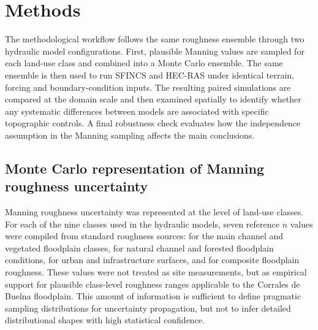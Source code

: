 \documentclass[a4paper,fleqn]{cas-sc}
\newcommand{\nman}{$n$}
\newcommand{\sfincs}{\textsc{SFINCS}}
\newcommand{\hecras}{\textsc{HEC-RAS}}
\begin{document}
\section{Methods}
\label{sec:methods}
The methodological workflow follows the same roughness ensemble through two hydraulic model configurations. First, plausible Manning values are sampled for each land-use class and combined into a Monte Carlo ensemble. The same ensemble is then used to run \sfincs{} and \hecras{} under identical terrain, forcing and boundary-condition inputs. The resulting paired simulations are compared at the domain scale and then examined spatially to identify whether any systematic differences between models are associated with specific topographic controls. A final robustness check evaluates how the independence assumption in the Manning sampling affects the main conclusions.

\subsection{Monte Carlo representation of Manning roughness uncertainty}\label{sec:manning_mc}
Manning roughness uncertainty was represented at the level of land-use classes. For each of the nine classes used in the hydraulic models, seven reference \nman{} values were compiled from standard roughness sources: \citet{chow1959} for the main channel and vegetated floodplain classes, \citet{barnes1967} for natural channel and forested floodplain conditions, \citet{brater1996} for urban and infrastructure surfaces, and \citet{arcement1989} for composite floodplain roughness. These values were not treated as site measurements, but as empirical support for plausible class-level roughness ranges applicable to the Corrales de Buelna floodplain. This amount of information is sufficient to define pragmatic sampling distributions for uncertainty propagation, but not to infer detailed distributional shapes with high statistical confidence.
\end{document}
